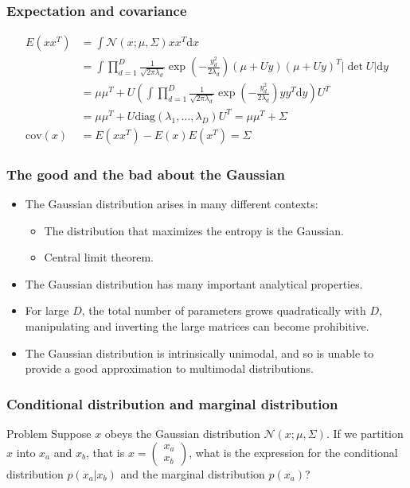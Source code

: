 \documentclass{beamer}
\begin{document}
\begin{frame}
    \frametitle{Expectation and covariance}
    \begin{align*}
        E(xx^{T})&=\int\mathcal{N}(x;\mu,\Sigma)xx^{T}\mathrm{d}x \\
        &=\int\prod_{d=1}^{D}\frac{1}{\sqrt{2\pi\lambda_{d}}}\exp(-\frac{y_{d}^{2}}{2\lambda_{d}})(\mu+Uy)(\mu+Uy)^{T}|\det{}U|\mathrm{d}y \\
        &=\mu\mu^{T}+U(\int\prod_{d=1}^{D}\frac{1}{\sqrt{2\pi\lambda_{d}}}\exp(-\frac{y_{d}^{2}}{2\lambda_{d}})yy^{T}\mathrm{d}y)U^{T} \\
        &=\mu\mu^{T}+U\mathrm{diag}(\lambda_{1},\hdots,\lambda_{D})U^{T}=\mu\mu^{T}+\Sigma \\
        \mathrm{cov}(x)&=E(xx^{T})-E(x)E(x^{T})=\Sigma
    \end{align*}
\end{frame}

\begin{frame}
    \frametitle{The good and the bad about the Gaussian}
    \begin{itemize}
        \item The Gaussian distribution arises in many different contexts:
        \begin{itemize}
            \item The distribution that maximizes the entropy is the Gaussian.
            \item Central limit theorem.
        \end{itemize}
        \item The Gaussian distribution has many important analytical properties.
        \item For large $D$, the total number of parameters grows quadratically with $D$, manipulating and inverting the large matrices can become prohibitive.
        \item The Gaussian distribution is intrinsically unimodal, and so is unable to provide a good approximation to multimodal distributions.
    \end{itemize}
\end{frame}

\begin{frame}
    \frametitle{Conditional distribution and marginal distribution}
    \begin{block}{Problem}
        Suppose $x$ obeys the Gaussian distribution $\mathcal{N}(x;\mu,\Sigma)$. If we partition $x$ into $x_{a}$ and $x_{b}$, that is $x=\begin{pmatrix}
            x_{a} \\
            x_{b}
        \end{pmatrix}$, what is the expression for the conditional distribution $p(x_{a}|x_{b})$ and the marginal distribution $p(x_{a})$?
    \end{block}
\end{frame}
\end{document}
